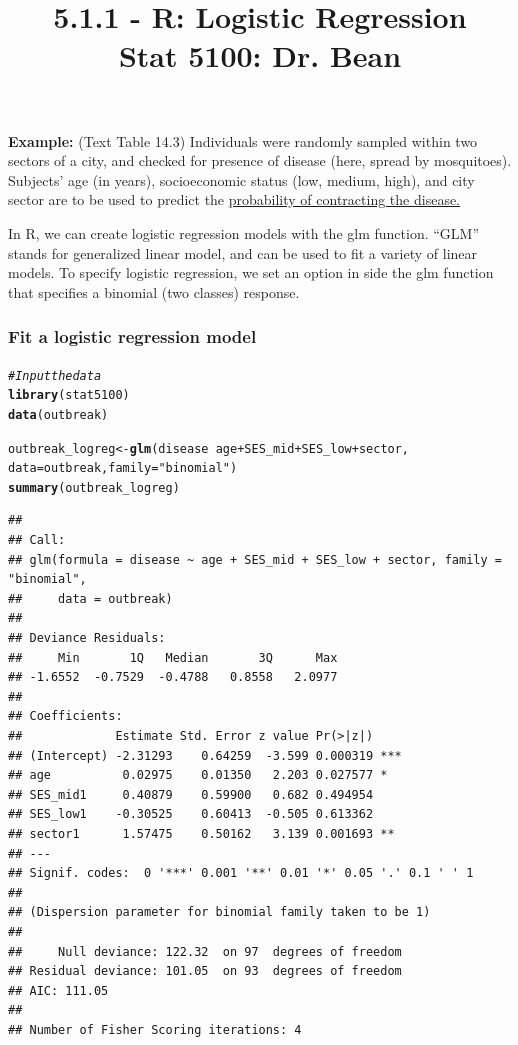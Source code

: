 \documentclass{article}\usepackage[]{graphicx}\usepackage[]{color}
\makeatletter
\newcommand{\hlstr}[1]{\textcolor[rgb]{0.192,0.494,0.8}{#1}}%
\newcommand{\hlcom}[1]{\textcolor[rgb]{0.678,0.584,0.686}{\textit{#1}}}%
\newcommand{\hlopt}[1]{\textcolor[rgb]{0,0,0}{#1}}%
\newcommand{\hlstd}[1]{\textcolor[rgb]{0.345,0.345,0.345}{#1}}%
\newcommand{\hlkwb}[1]{\textcolor[rgb]{0.69,0.353,0.396}{#1}}%
\newcommand{\hlkwc}[1]{\textcolor[rgb]{0.333,0.667,0.333}{#1}}%
\newcommand{\hlkwd}[1]{\textcolor[rgb]{0.737,0.353,0.396}{\textbf{#1}}}%
\newenvironment{kframe}{%
 \def\at@end@of@kframe{}%
 \ifinner\ifhmode%
  \def\at@end@of@kframe{\end{minipage}}%
  \begin{minipage}{\columnwidth}%
 \fi\fi%
 \def\FrameCommand##1{\hskip\@totalleftmargin \hskip-\fboxsep
 \colorbox{shadecolor}{##1}\hskip-\fboxsep
     \hskip-\linewidth \hskip-\@totalleftmargin \hskip\columnwidth}%
 \MakeFramed {\advance\hsize-\width
   \@totalleftmargin\z@ \linewidth\hsize
   \@setminipage}}%
 {\par\unskip\endMakeFramed%
 \at@end@of@kframe}
\newenvironment{knitrout}{}{} %
\makeatother
\begin{document}
\title{%
  5.1.1 - R: Logistic Regression \\
  \smallskip
  \large Stat 5100: Dr. Bean
}
\date{}

\maketitle

\textbf{Example:} (Text Table 14.3)  Individuals were randomly sampled within two sectors of a city, and checked for presence of disease (here, spread by mosquitoes).  Subjects’ age (in years), socioeconomic status (low, medium, high), and city sector are to be used to predict the \underline{probability of contracting the disease.}

In R, we can create logistic regression models with the glm function. ``GLM'' stands for generalized linear model, and can be used to fit a variety of linear models. To specify logistic regression, we set an option in side the glm function that specifies a binomial (two classes) response.

\subsubsection*{Fit a logistic regression model}

\begin{knitrout}
\color{fgcolor}\begin{kframe}
\begin{alltt}
\hlcom{# Input the data}
\hlkwd{library}\hlstd{(stat5100)}
\hlkwd{data}\hlstd{(outbreak)}

\hlstd{outbreak_logreg} \hlkwb{<-} \hlkwd{glm}\hlstd{(disease} \hlopt{~} \hlstd{age} \hlopt{+} \hlstd{SES_mid} \hlopt{+} \hlstd{SES_low} \hlopt{+} \hlstd{sector,}
                       \hlkwc{data} \hlstd{= outbreak,} \hlkwc{family} \hlstd{=} \hlstr{"binomial"}\hlstd{)}
\hlkwd{summary}\hlstd{(outbreak_logreg)}
\end{alltt}
\begin{verbatim}
## 
## Call:
## glm(formula = disease ~ age + SES_mid + SES_low + sector, family = "binomial", 
##     data = outbreak)
## 
## Deviance Residuals: 
##     Min       1Q   Median       3Q      Max  
## -1.6552  -0.7529  -0.4788   0.8558   2.0977  
## 
## Coefficients:
##             Estimate Std. Error z value Pr(>|z|)    
## (Intercept) -2.31293    0.64259  -3.599 0.000319 ***
## age          0.02975    0.01350   2.203 0.027577 *  
## SES_mid1     0.40879    0.59900   0.682 0.494954    
## SES_low1    -0.30525    0.60413  -0.505 0.613362    
## sector1      1.57475    0.50162   3.139 0.001693 ** 
## ---
## Signif. codes:  0 '***' 0.001 '**' 0.01 '*' 0.05 '.' 0.1 ' ' 1
## 
## (Dispersion parameter for binomial family taken to be 1)
## 
##     Null deviance: 122.32  on 97  degrees of freedom
## Residual deviance: 101.05  on 93  degrees of freedom
## AIC: 111.05
## 
## Number of Fisher Scoring iterations: 4
\end{verbatim}
\end{kframe}
\end{knitrout}
\end{document}
